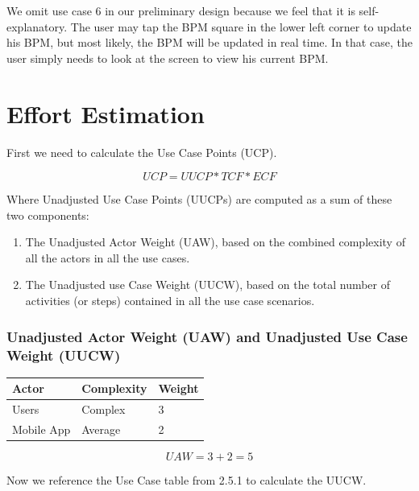 \documentclass[letterpaper,english, 12pt]{scrreprt}
\begin{document}
We omit use case 6 in our preliminary design because we feel that it is self-explanatory. The user may tap the BPM square in the lower left corner to update his BPM, but most likely, the BPM will be updated in real time. In that case, the user simply needs to look at the screen to view his current BPM.

\section{Effort Estimation}

First we need to calculate the Use Case Points (UCP).

\begin{equation}
UCP = UUCP* TCF *ECF
\end{equation}

Where Unadjusted Use Case Points (UUCPs) are computed as a sum of these two components:

\begin{enumerate}
\item The Unadjusted Actor Weight (UAW), based on the combined complexity of all the actors in all the use cases.
\item The Unadjusted use Case Weight (UUCW), based on the total number of activities (or steps) contained in all the use case scenarios.
\end{enumerate}


\subsubsection{Unadjusted Actor Weight (UAW) and Unadjusted Use Case Weight (UUCW)}
\begin{center}
        \begin{tabular}{|C{3cm}|C{3cm}|C{3cm}|}
                \hline
                        Actor & Complexity & Weight \\
                \hline
                       Users & Complex & 3 \\
                \hline
                       Mobile App & Average & 2 \\
                \hline
        \end{tabular}
\end{center}

\begin{equation}
UAW = 3 + 2 = 5
\end{equation}

Now we reference the Use Case table from 2.5.1 to calculate the UUCW.
\end{document}

